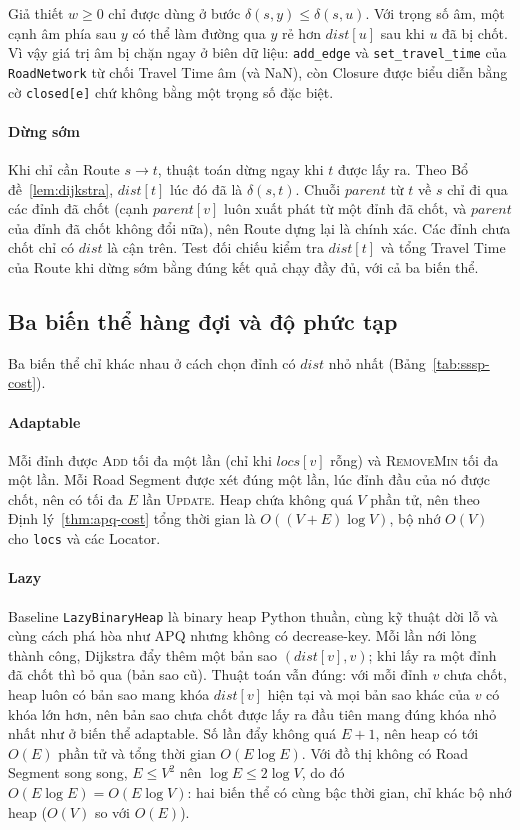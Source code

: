 Giả thiết $w \ge 0$ chỉ được dùng ở bước $\delta(s,y) \le \delta(s,u)$. Với trọng số âm, một cạnh âm phía sau $y$ có thể làm đường qua $y$ rẻ hơn $\mathit{dist}[u]$ sau khi $u$ đã bị chốt. Vì vậy giá trị âm bị chặn ngay ở biên dữ liệu: \texttt{add\_edge} và \texttt{set\_travel\_time} của \texttt{RoadNetwork} từ chối Travel Time âm (và NaN), còn Closure được biểu diễn bằng cờ \texttt{closed[e]} chứ không bằng một trọng số đặc biệt.

\paragraph{Dừng sớm}
Khi chỉ cần Route $s \to t$, thuật toán dừng ngay khi $t$ được lấy ra. Theo Bổ đề~\ref{lem:dijkstra}, $\mathit{dist}[t]$ lúc đó đã là $\delta(s,t)$. Chuỗi $\mathit{parent}$ từ $t$ về $s$ chỉ đi qua các đỉnh đã chốt (cạnh $\mathit{parent}[v]$ luôn xuất phát từ một đỉnh đã chốt, và $\mathit{parent}$ của đỉnh đã chốt không đổi nữa), nên Route dựng lại là chính xác. Các đỉnh chưa chốt chỉ có $\mathit{dist}$ là cận trên. Test đối chiếu kiểm tra $\mathit{dist}[t]$ và tổng Travel Time của Route khi dừng sớm bằng đúng kết quả chạy đầy đủ, với cả ba biến thể.

\subsection{Ba biến thể hàng đợi và độ phức tạp}

Ba biến thể chỉ khác nhau ở cách chọn đỉnh có $\mathit{dist}$ nhỏ nhất (Bảng~\ref{tab:sssp-cost}).

\paragraph{Adaptable}
Mỗi đỉnh được \textsc{Add} tối đa một lần (chỉ khi $\mathit{locs}[v]$ rỗng) và \textsc{RemoveMin} tối đa một lần. Mỗi Road Segment được xét đúng một lần, lúc đỉnh đầu của nó được chốt, nên có tối đa $E$ lần \textsc{Update}. Heap chứa không quá $V$ phần tử, nên theo Định lý~\ref{thm:apq-cost} tổng thời gian là $O((V+E)\log V)$, bộ nhớ $O(V)$ cho \texttt{locs} và các Locator.

\paragraph{Lazy}
Baseline \texttt{LazyBinaryHeap} là binary heap Python thuần, cùng kỹ thuật dời lỗ và cùng cách phá hòa như APQ nhưng không có decrease-key. Mỗi lần nới lỏng thành công, Dijkstra đẩy thêm một bản sao $(\mathit{dist}[v], v)$; khi lấy ra một đỉnh đã chốt thì bỏ qua (bản sao cũ). Thuật toán vẫn đúng: với mỗi đỉnh $v$ chưa chốt, heap luôn có bản sao mang khóa $\mathit{dist}[v]$ hiện tại và mọi bản sao khác của $v$ có khóa lớn hơn, nên bản sao chưa chốt được lấy ra đầu tiên mang đúng khóa nhỏ nhất như ở biến thể adaptable. Số lần đẩy không quá $E+1$, nên heap có tới $O(E)$ phần tử và tổng thời gian $O(E\log E)$. Với đồ thị không có Road Segment song song, $E \le V^2$ nên $\log E \le 2\log V$, do đó $O(E\log E) = O(E\log V)$: hai biến thể có cùng bậc thời gian, chỉ khác bộ nhớ heap ($O(V)$ so với $O(E)$).

